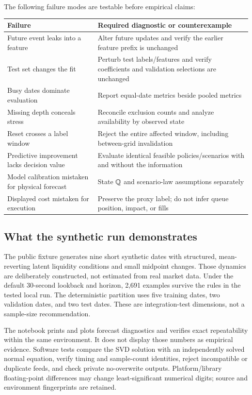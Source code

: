 The following failure modes are testable before empirical claims:
\par\medskip
\begin{tabularx}{\textwidth}{@{}p{37mm}Y@{}}\toprule
Failure & Required diagnostic or counterexample\\\midrule
Future event leaks into a feature & Alter future updates and verify the earlier feature prefix is unchanged\\
Test set changes the fit & Perturb test labels/features and verify coefficients and validation selections are unchanged\\
Busy dates dominate evaluation & Report equal-date metrics beside pooled metrics\\
Missing depth conceals stress & Reconcile exclusion counts and analyze availability by observed state\\
Reset crosses a label window & Reject the entire affected window, including between-grid invalidation\\
Predictive improvement lacks decision value & Evaluate identical feasible policies/scenarios with and without the information\\
Model calibration mistaken for physical forecast & State $\mathbb Q$ and scenario-law assumptions separately\\
Displayed cost mistaken for execution & Preserve the proxy label; do not infer queue position, impact, or fills\\\bottomrule
\end{tabularx}
\par\medskip

\subsection{What the synthetic run demonstrates}
The public fixture generates nine short synthetic dates with structured, mean-reverting latent liquidity conditions and small midpoint changes. Those dynamics are deliberately constructed, not estimated from real market data. Under the default 30-second lookback and horizon, 2,691 examples survive the rules in the tested local run. The deterministic partition uses five training dates, two validation dates, and two test dates. These are integration-test dimensions, not a sample-size recommendation.

The notebook prints and plots forecast diagnostics and verifies exact repeatability within the same environment. It does not display those numbers as empirical evidence. Software tests compare the SVD solution with an independently solved normal equation, verify timing and sample-count identities, reject incompatible or duplicate feeds, and check private no-overwrite outputs. Platform/library floating-point differences may change least-significant numerical digits; source and environment fingerprints are retained.


